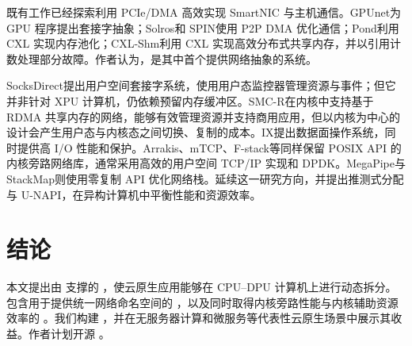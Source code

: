既有工作\cite{10.1145/2934872.2934897,10.1145/2872362.2872401,10.1145/3230543.3230560,234944}已经探索利用 PCIe/DMA 高效实现 SmartNIC 与主机通信。GPUnet\cite{kim2014gpunet}为 GPU 程序提出套接字抽象；Solros\cite{min2018s}和 SPIN\cite{bergman2017spin}使用 P2P DMA 优化通信；Pond\cite{10.1145/3575693.3578835}利用 CXL 实现内存池化；CXL-Shm\cite{10.1145/3600006.3613135}利用 CXL 实现高效分布式共享内存，并以引用计数处理部分故障。作者认为，\os 是其中首个提供网络抽象的系统。

SocksDirect\cite{10.1145/3341302.3342071}提出用户空间套接字系统，使用用户态监控器管理资源与事件；但它并非针对 XPU 计算机，仍依赖预留内存缓冲区。SMC-R\cite{rfc7609}在内核中支持基于 RDMA 共享内存的网络，能够有效管理资源并支持商用应用，但以内核为中心的设计会产生用户态与内核态之间切换、复制的成本。IX\cite{belay2014ix}提出数据面操作系统，同时提供高 I/O 性能和保护。Arrakis\cite{peter2015arrakis}、mTCP\cite{10.5555/2616448.2616493}、F-stack\cite{f-stack}等同样保留 POSIX API 的内核旁路网络库，通常采用高效的用户空间 TCP/IP 实现和 DPDK。MegaPipe\cite{10.5555/2387880.2387894}与 StackMap\cite{196184}则使用零复制 API 优化网络栈。\os 延续这一研究方向，并提出推测式分配与 U-NAPI，在异构计算机中平衡性能和资源效率。

\section{结论}
\label{s:conclusion}

本文提出由 \os 支撑的 \xpod，使云原生应用能够在 CPU--DPU 计算机上进行动态拆分。\os 包含用于提供统一网络命名空间的 \giptable，以及同时取得内核旁路性能与内核辅助资源效率的 \gsocket。我们构建 \sys，并在无服务器计算和微服务等代表性云原生场景中展示其收益。作者计划开源 \os。
